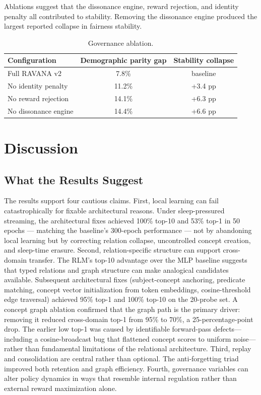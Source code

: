 \documentclass[11pt]{article}
\begin{document}
Ablations suggest that the dissonance engine, reward rejection, and identity penalty all contributed to stability. Removing the dissonance engine produced the largest reported collapse in fairness stability.

\begin{table}[h]
\centering
\caption{Governance ablation.}
\label{tab:governance-ablation}
\begin{tabular}{lcc}
\toprule
Configuration & Demographic parity gap & Stability collapse \\
\midrule
Full RAVANA v2 & 7.8\% & baseline \\
No identity penalty & 11.2\% & +3.4 pp \\
No reward rejection & 14.1\% & +6.3 pp \\
No dissonance engine & 14.4\% & +6.6 pp \\
\bottomrule
\end{tabular}
\end{table}

\section{Discussion}
\subsection{What the Results Suggest}
The results support four cautious claims. First, local learning can fail catastrophically for fixable architectural reasons. Under sleep-pressured streaming, the architectural fixes achieved 100\% top-10 and 53\% top-1 in 50 epochs --- matching the baseline's 300-epoch performance --- not by abandoning local learning but by correcting relation collapse, uncontrolled concept creation, and sleep-time erasure. Second, relation-specific structure can support cross-domain transfer. The RLM's top-10 advantage over the MLP baseline suggests that typed relations and graph structure can make analogical candidates available. Subsequent architectural fixes (subject-concept anchoring, predicate matching, concept vector initialization from token embeddings, cosine-threshold edge traversal) achieved 95\% top-1 and 100\% top-10 on the 20-probe set. A concept graph ablation confirmed that the graph path is the primary driver: removing it reduced cross-domain top-1 from 95\% to 70\%, a 25-percentage-point drop. The earlier low top-1 was caused by identifiable forward-pass defects---including a cosine-broadcast bug that flattened concept scores to uniform noise---rather than fundamental limitations of the relational architecture. Third, replay and consolidation are central rather than optional. The anti-forgetting triad improved both retention and graph efficiency. Fourth, governance variables can alter policy dynamics in ways that resemble internal regulation rather than external reward maximization alone.
\end{document}
